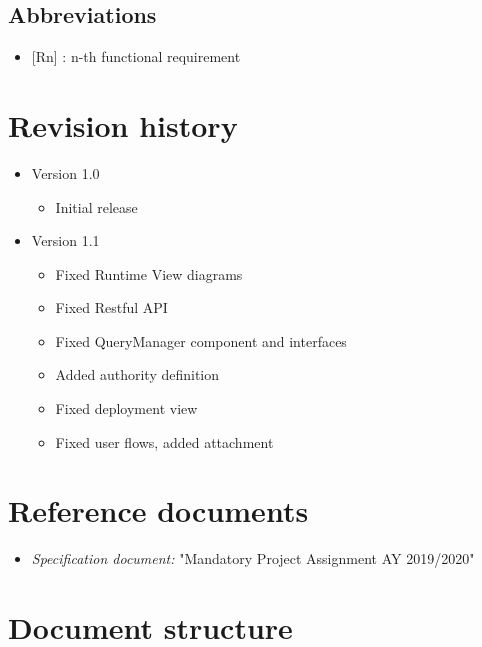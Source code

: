 			\subsection{Abbreviations}
				\begin{itemize}
					\item {[Rn]} : n-th functional requirement
				\end{itemize}
		\section{Revision history}
			\begin{itemize}
				\item Version 1.0
					\begin{itemize}
						\item Initial release
					\end{itemize}
				\item Version 1.1
					\begin{itemize}
						\item Fixed Runtime View diagrams
						\item Fixed Restful API
						\item Fixed QueryManager component and interfaces
						\item Added authority definition
						\item Fixed deployment view
						\item Fixed user flows, added attachment
					\end{itemize}
			\end{itemize}
		\section{Reference documents}
			\begin{itemize}
				\item \textit{Specification document:} "Mandatory Project Assignment AY 2019/2020"
			\end{itemize}
		\section{Document structure}
